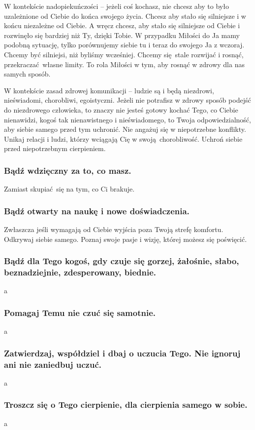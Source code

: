W kontekście nadopiekuńczości -- jeżeli coś kochasz, nie chcesz aby to było uzależnione od Ciebie do końca swojego życia.
Chcesz aby stało się silniejsze i w końcu niezależne od Ciebie.
A wręcz chcesz, aby stało się silniejsze od Ciebie i rozwinęło się bardziej niż Ty, dzięki Tobie.
W przypadku Miłości do Ja mamy podobną sytuację, tylko porównujemy siebie tu i teraz do swojego Ja z wczoraj.
Chcemy być silniejsi, niż byliśmy wcześniej. 
Chcemy się stale rozwijać i rosnąć, przekraczać własne limity.
To rola Miłości w tym, aby rosnąć w zdrowy dla nas samych sposób.

W kontekście zasad zdrowej komunikacji -- ludzie są i będą niezdrowi, nieświadomi, chorobliwi, egoistyczni.
Jeżeli nie potrafisz w zdrowy sposób podejść do niezdrowego człowieka, to znaczy nie jesteś gotowy kochać Tego, co Ciebie nienawidzi, kogoś tak nienawistnego i nieświadomego, to Twoja odpowiedzialność, aby siebie samego przed tym uchronić.
Nie angażuj się w niepotrzebne konflikty.
Unikaj relacji i ludzi, którzy wciągają Cię w swoją chorobliwość.
Uchroń siebie przed niepotrzebnym cierpieniem.

\subsubsection{Bądź wdzięczny za to, co masz.}
Zamiast skupiać się na tym, co Ci brakuje.
\subsubsection{Bądź otwarty na naukę i nowe doświadczenia.}
Zwłaszcza jeśli wymagają od Ciebie wyjścia poza Twoją strefę komfortu.
Odkrywaj siebie samego. Poznaj swoje pasje i wizję, której możesz się poświęcić.
\subsubsection{Bądź dla Tego kogoś, gdy czuje się gorzej, żałośnie, słabo, beznadziejnie, zdesperowany, biednie.}
a 
\subsubsection{Pomagaj Temu nie czuć się samotnie.}
a 
\subsubsection{Zatwierdzaj, współdziel i dbaj o uczucia Tego. Nie ignoruj ani nie zaniedbuj uczuć.}
a 
\subsubsection{Troszcz się o Tego cierpienie, dla cierpienia samego w sobie.}
a 
